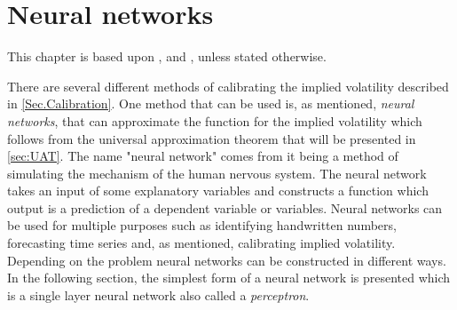 \chapter{Neural networks}\label{Ch.3}
This chapter is based upon \citep[Ch. 10]{SL-ISLR}, \citep[Ch. 1]{NN} and \citep[Ch. 2]{NNDL}, unless stated otherwise.


There are several different methods of calibrating the implied volatility described in \autoref{Sec.Calibration}. One method that can be used is, as mentioned, \emph{neural networks}, that can approximate the function for the implied volatility which follows from the universal approximation theorem that will be presented in \autoref{sec:UAT}. The name "neural network" comes from it being a method of simulating the mechanism of the human nervous system. The neural network takes an input of some explanatory variables and constructs a function which output is a prediction of a dependent variable or variables. Neural networks can be used for multiple purposes such as identifying handwritten numbers, forecasting time series and, as mentioned, calibrating implied volatility. Depending on the problem neural networks can be constructed in different ways. In the following section, the simplest form of a neural network is presented which is a single layer neural network also called a \emph{perceptron}.


